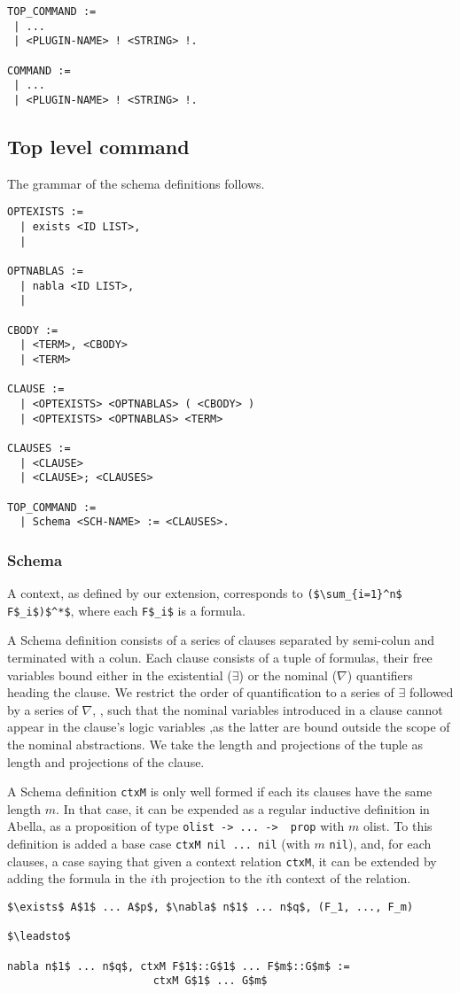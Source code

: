 \documentclass[nocopyrightspace,authoryear]{sigplanconf}
\begin{document}
\begin{lstlisting}
TOP_COMMAND :=
 | ...
 | <PLUGIN-NAME> ! <STRING> !.

COMMAND :=
 | ...
 | <PLUGIN-NAME> ! <STRING> !.
\end{lstlisting}



\subsection{Top level command}
The grammar of the schema definitions follows.

\begin{lstlisting}
OPTEXISTS :=
  | exists <ID LIST>, 
  |

OPTNABLAS :=
  | nabla <ID LIST>,
  |

CBODY :=
  | <TERM>, <CBODY>
  | <TERM>

CLAUSE :=
  | <OPTEXISTS> <OPTNABLAS> ( <CBODY> )
  | <OPTEXISTS> <OPTNABLAS> <TERM>

CLAUSES :=
  | <CLAUSE>
  | <CLAUSE>; <CLAUSES>

TOP_COMMAND :=
  | Schema <SCH-NAME> := <CLAUSES>.
\end{lstlisting} 

\subsubsection{Schema}
A context, as defined by our extension, corresponds to \lstinline|($\sum_{i=1}^n$ F$_i$)$^*$|, where each \lstinline|F$_i$| is a formula. 

A Schema definition consists of a series of clauses separated by semi-colun and terminated with a colun. Each clause consists of a tuple of formulas, their free variables bound either in the existential ($\exists$) or the nominal ($\nabla$) quantifiers heading the clause. We restrict the order of quantification to a series of $\exists$ followed by a series of $\nabla$, , such that the nominal variables introduced in a clause cannot appear in the clause's logic variables ,as the latter are bound outside the scope of the nominal abstractions. We take the length and projections of the tuple as length and projections of the clause.

A Schema definition \lstinline|ctxM| is only well formed if each its clauses have the same length $m$. In that case, it can be expended as a regular inductive definition in Abella, as a proposition of type \lstinline|olist -> ... ->  prop| with $m$ olist. To this definition is added a base case \lstinline|ctxM nil ... nil| (with $m$ \lstinline|nil|), and, for each clauses, a case saying that given a context relation \lstinline|ctxM|, it can be extended by adding the formula in the $i$th projection to the $i$th context of the relation.
\begin{lstlisting}
$\exists$ A$1$ ... A$p$, $\nabla$ n$1$ ... n$q$, (F_1, ..., F_m)

$\leadsto$

nabla n$1$ ... n$q$, ctxM F$1$::G$1$ ... F$m$::G$m$ := 
                       ctxM G$1$ ... G$m$
\end{lstlisting}
\end{document}
